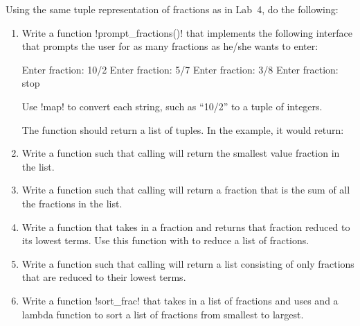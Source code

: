 \documentclass[11pt]{cselabheader}
\begin{document}
\begin{ex}[fractions2.py] Using the same tuple representation of fractions as in
    Lab~4, do the following:

    \begin{enumerate}
      \item Write a function \pythoninline!prompt_fractions()! that implements the
        following interface that prompts the user for as many fractions as
        he/she wants to enter:

        \begin{verbatimcode}
Enter fraction: 10/2
Enter fraction: 5/7
Enter fraction: 3/8
Enter fraction: stop
        \end{verbatimcode}

        Use \pythoninline!map! to convert each string, such as ``10/2'' to a
        tuple of integers.

        The function should return a list of tuples. In the example, it would
        return:
        \begin{python3code}
[(10, 2), (5, 7), (3, 8)]
        \end{python3code}

      \item Write a function  such that calling
         will return
        the smallest value fraction in the list.
      \item Write a function  such that calling
         will return
        a fraction that is the sum of all the fractions in the list.
      \item Write a function  that takes in a fraction
        and returns that fraction reduced to its lowest terms. Use this function
        with  to reduce a list of fractions.
      \item Write a function  such that calling
         will return a list consisting
        of only fractions that are reduced to their lowest terms.
      \item Write a function \pythoninline!sort_frac! that takes in a list of
        fractions and uses 
        and a lambda  function to sort a list of fractions from
        smallest to largest.
    \end{enumerate}


\end{ex}
\end{document}
